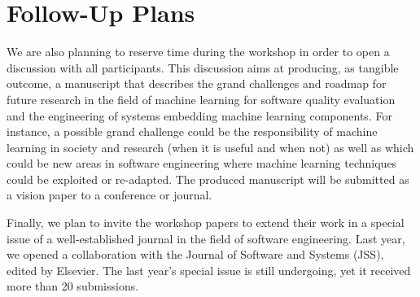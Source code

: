 
\section{Follow-Up Plans}
We are also planning to reserve time during the workshop in order to open a discussion with all participants. This discussion aims at producing, as tangible outcome, a manuscript that describes the grand challenges and roadmap for future research in the field of machine learning for software quality evaluation and the engineering of systems embedding machine learning components. For instance, a possible grand challenge could be the responsibility of machine learning in society and research (\eg when it is useful and when not) as well as which could be new areas in software engineering where machine learning techniques could be exploited or re-adapted. The produced manuscript will be submitted as a vision paper to a conference or journal.

Finally, we plan to invite the workshop papers to extend their work in a special issue of a well-established journal in the field of software engineering. Last year, we opened a collaboration with the Journal of Software and Systems (JSS), edited by Elsevier. The last year's special issue is still undergoing, yet it received more than 20 submissions.
